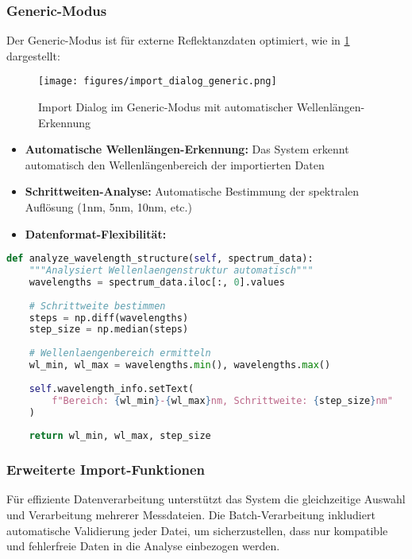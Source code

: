 \subsubsection{Generic-Modus}
Der Generic-Modus ist für externe Reflektanzdaten optimiert, wie in \ref{fig:import_generic} dargestellt:

\begin{figure}[H]
\centering
\texttt{[image: figures/import\_dialog\_generic.png]}
\caption{Import Dialog im Generic-Modus mit automatischer Wellenlängen-Erkennung}
\label{fig:import_generic}
\end{figure}

\begin{itemize}
    \item \textbf{Automatische Wellenlängen-Erkennung:} Das System erkennt automatisch den Wellenlängenbereich der importierten Daten
    \item \textbf{Schrittweiten-Analyse:} Automatische Bestimmung der spektralen Auflösung (1nm, 5nm, 10nm, etc.)
    \item \textbf{Datenformat-Flexibilität:} 
\end{itemize}

\begin{lstlisting}[language=Python, caption=Automatische Wellenlängen-Erkennung im Generic-Modus]
def analyze_wavelength_structure(self, spectrum_data):
    """Analysiert Wellenlaengenstruktur automatisch"""
    wavelengths = spectrum_data.iloc[:, 0].values
    
    # Schrittweite bestimmen
    steps = np.diff(wavelengths)
    step_size = np.median(steps)
    
    # Wellenlaengenbereich ermitteln  
    wl_min, wl_max = wavelengths.min(), wavelengths.max()
    
    self.wavelength_info.setText(
        f"Bereich: {wl_min}-{wl_max}nm, Schrittweite: {step_size}nm"
    )
    
    return wl_min, wl_max, step_size
\end{lstlisting}

\subsubsection{Erweiterte Import-Funktionen}

Für effiziente Datenverarbeitung unterstützt das System die gleichzeitige Auswahl und Verarbeitung mehrerer Messdateien. Die Batch-Verarbeitung inkludiert automatische Validierung jeder Datei, um sicherzustellen, dass nur kompatible und fehlerfreie Daten in die Analyse einbezogen werden.

